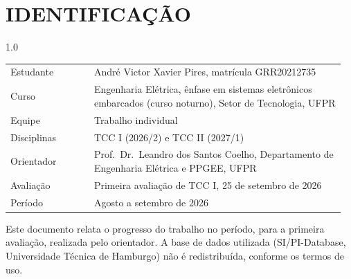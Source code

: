 
\chapter*{IDENTIFICAÇÃO}

\begin{spacing}{1.0}

\noindent
\begin{tabular}{@{}p{0.24\linewidth}p{0.72\linewidth}@{}}
\toprule
Estudante & André Victor Xavier Pires, matrícula GRR20212735 \\[0.2em]
Curso & Engenharia Elétrica, ênfase em sistemas eletrônicos embarcados
(curso noturno), Setor de Tecnologia, UFPR \\[0.2em]
Equipe & Trabalho individual \\[0.2em]
Disciplinas & TCC I (2026/2) e TCC II (2027/1) \\
\midrule
Orientador & Prof.\ Dr.\ Leandro dos Santos Coelho, Departamento de Engenharia
Elétrica e PPGEE, UFPR \\
\midrule
Avaliação & Primeira avaliação de TCC I, 25 de setembro de 2026 \\[0.2em]
Período & Agosto a setembro de 2026 \\
\bottomrule
\end{tabular}

\vspace{1.2em}

\noindent
{\footnotesize Este documento relata o progresso do trabalho no período,
para a primeira avaliação, realizada pelo orientador. A base de dados
utilizada (SI/PI-Database, Universidade Técnica de Hamburgo) não é
redistribuída, conforme os termos de uso.}

\end{spacing}

\vspace{1em}

